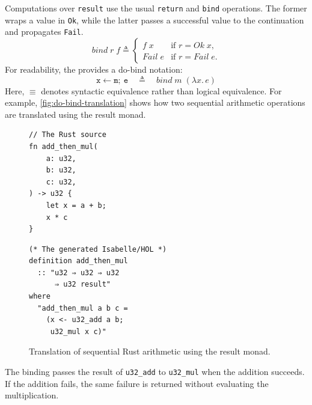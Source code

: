 Computations over \texttt{result} use the usual \texttt{return} and
\texttt{bind} operations.  The former wraps a value in \texttt{Ok}, while the latter passes a successful value to the continuation and propagates \texttt{Fail}.
\begin{equation}
  \mathit{bind}\;r\;f
  \triangleq
  \begin{cases}
    f\;x & \text{if } r = \mathit{Ok}\;x,\\
    \mathit{Fail}\;e & \text{if } r = \mathit{Fail}\;e.
  \end{cases}
  \label{eq:result-bind}
\end{equation}
For readability, the \rprelude{} provides a do-bind notation:
\begin{equation}
  \mathtt{x}\leftarrow\mathtt{m};\ \mathtt{e}
  \quad\triangleq\quad
  \mathit{bind}\;m\;(\lambda x.\,e)
  \label{eq:do-bind}
\end{equation}
Here, \(\equiv\) denotes syntactic equivalence rather than logical equivalence.
For example, \autoref{fig:do-bind-translation} shows how two sequential
arithmetic operations are translated using the result monad.

\begin{figure}[!ht]
\centering
\begin{minipage}[t]{0.45\textwidth}
\centering
\begin{verbatim}
// The Rust source
fn add_then_mul(
    a: u32,
    b: u32,
    c: u32,
) -> u32 {
    let x = a + b;
    x * c
}
\end{verbatim}
\end{minipage}
\hfill
\vrule{}
\hfill
\begin{minipage}[t]{0.5\textwidth}
\centering
\begin{verbatim}
(* The generated Isabelle/HOL *)
definition add_then_mul
  :: "u32 ⇒ u32 ⇒ u32
      ⇒ u32 result"
where
  "add_then_mul a b c =
    (x <- u32_add a b;
     u32_mul x c)"
\end{verbatim}
\end{minipage}
\caption{Translation of sequential Rust arithmetic using the result monad.}
\label{fig:do-bind-translation}
\end{figure}
The binding passes the result of \texttt{u32\_add} to \texttt{u32\_mul} when the addition succeeds. If the addition fails, the same failure is returned without evaluating the multiplication.

